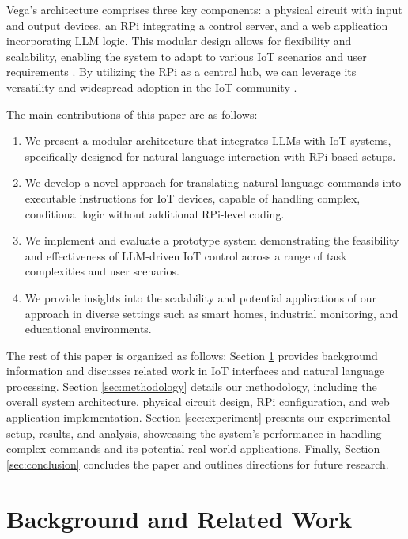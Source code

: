 \documentclass{ieeeaccess}
\begin{document}
Vega's architecture comprises three key components: a physical circuit with input and output devices, an RPi integrating a control server, and a web application incorporating LLM logic. This modular design allows for flexibility and scalability, enabling the system to adapt to various IoT scenarios and user requirements \cite{taylor2010software}. By utilizing the RPi as a central hub, we can leverage its versatility and widespread adoption in the IoT community \cite{8067944}.

The main contributions of this paper are as follows:

\begin{enumerate}
    \item We present a modular architecture that integrates LLMs with IoT systems, specifically designed for natural language interaction with RPi-based setups.
    \item We develop a novel approach for translating natural language commands into executable instructions for IoT devices, capable of handling complex, conditional logic without additional RPi-level coding.
    \item We implement and evaluate a prototype system demonstrating the feasibility and effectiveness of LLM-driven IoT control across a range of task complexities and user scenarios.
    \item We provide insights into the scalability and potential applications of our approach in diverse settings such as smart homes, industrial monitoring, and educational environments.
\end{enumerate}

The rest of this paper is organized as follows: Section \ref{sec:background} provides background information and discusses related work in IoT interfaces and natural language processing. Section \ref{sec:methodology} details our methodology, including the overall system architecture, physical circuit design, RPi configuration, and web application implementation. Section \ref{sec:experiment} presents our experimental setup, results, and analysis, showcasing the system's performance in handling complex commands and its potential real-world applications. Finally, Section \ref{sec:conclusion} concludes the paper and outlines directions for future research.

\section{Background and Related Work}
\label{sec:background}
\end{document}
